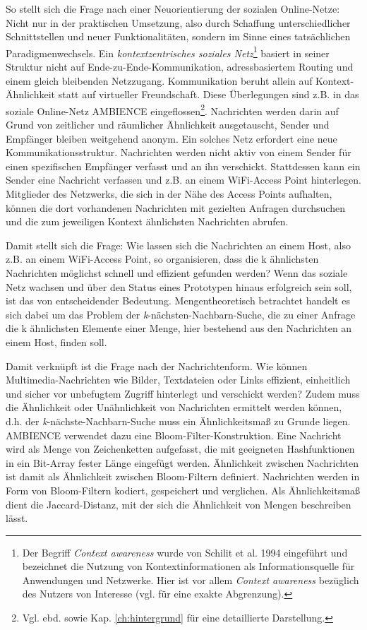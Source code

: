 So stellt sich die Frage nach einer Neuorientierung der sozialen Online-Netze: Nicht nur in der praktischen Umsetzung, also durch Schaffung unterschiedlicher Schnittstellen und neuer Funktionalitäten, sondern im  Sinne eines tatsächlichen Paradigmenwechsels. Ein \textit{kontextzentrisches soziales Netz}\footnote{Der Begriff \textit{Context awareness} wurde von Schilit et al. 1994 eingeführt und bezeichnet die Nutzung von Kontextinformationen als Informationsquelle für Anwendungen und Netzwerke. Hier ist vor allem \textit{Context awareness} bezüglich des Nutzers von Interesse (vgl. \cite{Werner2015} für eine exakte Abgrenzung).} basiert in seiner Struktur nicht auf Ende-zu-Ende-Kommunikation, adressbasiertem  Routing und einem gleich bleibenden Netzzugang. Kommunikation beruht allein auf Kontext-Ähnlichkeit statt auf virtueller Freundschaft. Diese Überlegungen sind z.B. in das soziale Online-Netz AMBIENCE eingeflossen\footnote{Vgl. ebd. sowie Kap. \ref{ch:hintergrund} für eine detaillierte Darstellung.}. Nachrichten werden darin auf Grund von zeitlicher und räumlicher Ähnlichkeit ausgetauscht, Sender und Empfänger bleiben weitgehend anonym. Ein solches Netz erfordert eine neue Kommunikationsstruktur. Nachrichten werden nicht aktiv von einem Sender für einen spezifischen Empfänger verfasst und an ihn verschickt. Stattdessen kann ein Sender eine Nachricht verfassen und z.B. an einem WiFi-Access Point hinterlegen. Mitglieder des Netzwerks, die sich in der Nähe des Access Points aufhalten, können die dort vorhandenen Nachrichten mit gezielten Anfragen durchsuchen und die zum jeweiligen Kontext ähnlichsten Nachrichten abrufen. 

Damit stellt sich die Frage: Wie lassen sich die Nachrichten an einem Host, also z.B. an einem WiFi-Access Point, so organisieren, dass die k ähnlichsten Nachrichten möglichst schnell und effizient gefunden werden?  Wenn das soziale Netz wachsen und über den Status eines Prototypen hinaus erfolgreich sein soll, ist das von entscheidender Bedeutung. Mengentheoretisch betrachtet handelt es sich dabei um das Problem der \textit{k}-nächsten-Nachbarn-Suche, die zu einer Anfrage die k ähnlichsten Elemente einer Menge, hier bestehend aus den Nachrichten an einem Host, finden soll. 

Damit verknüpft ist die Frage nach der Nachrichtenform. Wie können Multimedia-Nach\-rich\-ten wie Bilder, Textdateien oder Links effizient, einheitlich und sicher vor unbefugtem Zugriff hinterlegt und verschickt werden? Zudem muss die Ähnlichkeit oder Unähnlichkeit von Nachrichten ermittelt werden können, d.h. der \textit{k}-nächste-Nachbarn-Suche muss ein Ähnlichkeitsmaß zu Grunde liegen. AMBIENCE verwendet dazu eine Bloom-Filter-Konstruktion. Eine Nachricht wird als Menge von Zeichenketten aufgefasst, die mit geeigneten Hashfunktionen in ein Bit-Array fester Länge eingefügt werden. Ähnlichkeit zwischen Nachrichten ist damit als Ähnlichkeit zwischen Bloom-Filtern definiert. Nachrichten werden in Form von Bloom-Filtern kodiert, gespeichert und verglichen. Als Ähnlichkeitsmaß dient die Jaccard-Distanz, mit der sich die Ähnlichkeit von Mengen beschreiben lässt. 

